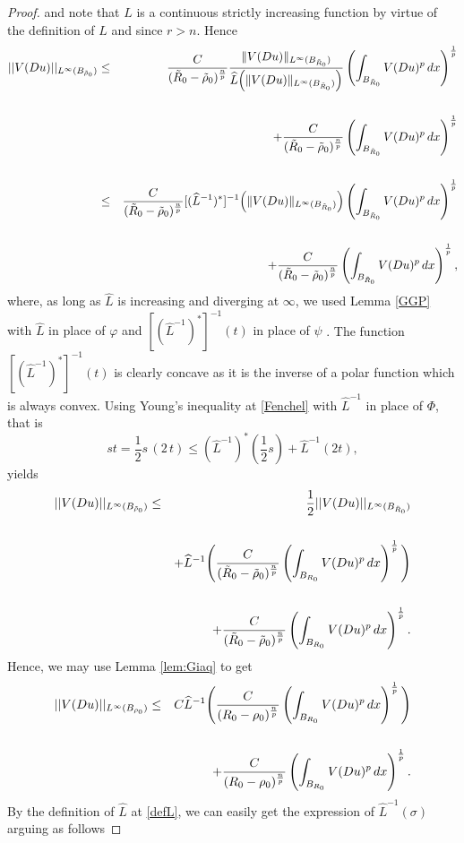 \documentclass[12pt]{amsart}
\theoremstyle{definition}
\numberwithin{equation}{section}
\numberwithin{equation}{section}
\begin{document}
{\begin{proof}
and note that $\widehat{L}$ is a continuous strictly increasing function  by virtue of the definition of $L$ and since $r>n$. Hence %
\begin{eqnarray*}
	||V(Du)||_{L^{\infty}(B_{\tilde\rho_0})} &\le &\frac{C}{(\tilde R_0-\tilde \rho_0 )^{\frac{n}{p}}} \frac{\|V(Du)\|_{{L^{\infty}(B_{\tilde R_0})}}}{\widehat{L}\Big(\|V(Du)\|_{L^{\infty}(B_{\tilde R_0})}\Big)}  \left(\int_{B_{\tilde R_0}}V(Du)^{p}
\, dx\right)^{\frac{1}{p}}\cr\cr
&&\quad+ \frac{C}{(\tilde R_0-\tilde \rho_0 )^{\frac{n}{p}}}  \left(\int_{B_{\tilde R_0}}V(Du)^{p}
\, dx\right)^{\frac{1}{p}}
\cr\cr
&\le&  \frac{C}{(\tilde R_0-\tilde \rho_0 )^{\frac{n}{p}}} [(\widehat{L}^{-1})^*]^{-1}\Big({\|V(Du)\|_{L^{\infty}(B_{\tilde R_0})}}\Big) \left(\int_{B_{\tilde R_0}}V(Du)^{p}
\, dx\right)^{\frac{1}{p}}\cr\cr
&&\quad+ \frac{C}{(\tilde R_0-\tilde \rho_0 )^{\frac{n}{p}}}  \left(\int_{B_{\tilde R_0}}V(Du)^{p}
\, dx\right)^{\frac{1}{p}},
\end{eqnarray*}
where, as long as $\widehat{L}$ is increasing and diverging at $\infty$, we used Lemma \ref{GGP} {with $\widehat{L}$ in place of ${\varphi}$ and $[(\widehat{L}^{-1})^*]^{-1}(t)$ in place of ${\psi}$ }. The function $[(\widehat{L}^{-1})^*]^{-1}(t)$
is clearly concave as it is the inverse of a polar function which is always convex. 
 Using Young's inequality at \eqref{Fenchel} with $\widehat{L}^{-1}$ in place of $\Phi$, that is
 $$st = {\frac{1}{2} s \, (2 \, t)}\le (\widehat{L}^{-1})^*\left({\frac{1}{2} s}\right)+ \widehat{L}^{-1}({2 t}),$$ yields
\begin{eqnarray*}
	||V(Du)||_{L^{\infty}(B_{\tilde\rho_0})} &\le&  \frac12||V(Du)||_{L^{\infty}(B_{\tilde R_0})}\cr\cr
 &&+ \widehat{L}^{-1}\Bigg(\frac{C}{(\tilde R_0-\tilde \rho_0 )^{\frac{n}{p}}}\left(\int_{B_{ R_0}}V(Du)^{p}
\, dx\right)^{\frac{1}{p}}\Bigg) \cr\cr
 &&+ \frac{C}{(\tilde R_0- \tilde \rho_0 )^{\frac{n}{p}}}  \left(\int_{B_{ R_0}}V(Du)^{p}
\, dx\right)^{\frac{1}{p}}.
\end{eqnarray*}
Hence, we may use  Lemma  \ref{lem:Giaq} to get
\begin{eqnarray}\label{apriori}
	||V(Du)||_{L^{\infty}(B_{\rho_0})} &\le&   C\widehat{L}^{-1} \Bigg(\frac{C}{(R_0- \rho_0 )^{\frac{n}{p}}}\left(\int_{B_{ R_0}}V(Du)^{p}
\, dx\right)^{\frac{1}{p}}\Bigg)\cr\cr
&&\quad+ \frac{C}{(R_0 - \rho_0 )^{\frac{n}{p}}}  \left(\int_{B_{R_0}}V(Du)^{p}
\, dx\right)^{\frac{1}{p}}.
\end{eqnarray}
By the definition of $\widehat{L}$ at \eqref{defL}, we can easily get the expression of $\widehat{L}^{-1}(\sigma)$ arguing as follows

\end{proof}}
\end{document}

